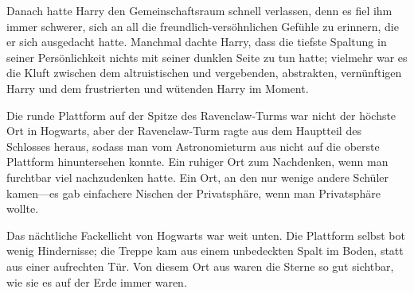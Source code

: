 Danach hatte Harry den Gemeinschaftsraum schnell verlassen, denn es fiel ihm immer schwerer, sich an all die freundlich-versöhnlichen Gefühle zu erinnern, die er sich ausgedacht hatte.
Manchmal dachte Harry, dass die tiefste Spaltung in seiner Persönlichkeit nichts mit seiner dunklen Seite zu tun hatte; vielmehr war es die Kluft zwischen dem altruistischen und vergebenden, abstrakten, vernünftigen Harry und dem frustrierten und wütenden Harry im Moment.

Die runde Plattform auf der Spitze des Ravenclaw-Turms war nicht der höchste Ort in Hogwarts, aber der Ravenclaw-Turm ragte aus dem Hauptteil des Schlosses heraus, sodass man vom Astronomieturm aus nicht auf die oberste Plattform hinuntersehen konnte. Ein ruhiger Ort zum Nachdenken, wenn man furchtbar viel nachzudenken hatte. Ein Ort, an den nur wenige andere Schüler kamen—es gab einfachere Nischen der Privatsphäre, wenn man Privatsphäre wollte.

Das nächtliche Fackellicht von Hogwarts war weit unten. Die Plattform selbst bot wenig Hindernisse; die Treppe kam aus einem unbedeckten Spalt im Boden, statt aus einer aufrechten Tür. Von diesem Ort aus waren die Sterne so gut sichtbar, wie sie es auf der Erde immer waren.

